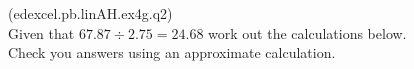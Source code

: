 \documentclass[10pt]{exam}
\newcommand{\sol}[1]{\color{gray}\fillwithlines{#1}\color{black}}
\begin{document}
\begin{questions}
\newpage 
\addpoints

\question (edexcel.pb.linAH.ex4g.q2) \\
Given that $67.87 \div 2.75 = 24.68$ work out the calculations below.\\
Check you answers using an approximate calculation.
\sol{\fill}


\end{questions}
\end{document}
